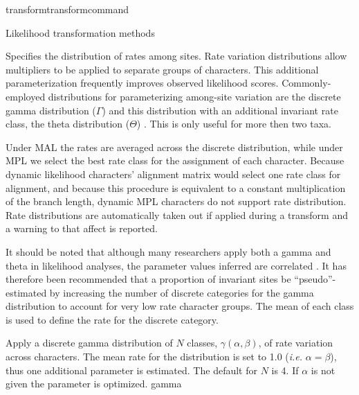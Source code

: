 \begin{command}{transform}{transformcommand}
\begin{arguments}
\begin{argumentgroup}{Likelihood transformation methods}
                {Specifies the distribution of rates among sites. Rate
                variation distributions allow multipliers to be applied to
                separate groups of characters. This additional parameterization
                frequently improves observed likelihood scores.
                Commonly-employed distributions for parameterizing among-site
                variation are the discrete gamma distribution ($\Gamma$)
                \cite{yang1994a} and this distribution with an additional
                invariant rate class, the theta distribution ($\Theta$)
                \cite{gu1995}. This is only useful for more then two taxa.
                
                \begin{statement}
                    Under MAL the rates are averaged across the
                    discrete distribution, while under MPL we select the best
                    rate class for the assignment of each character. Because
                    dynamic likelihood characters' alignment matrix would select
                    one rate class for alignment, and because this procedure is equivalent to a
                    constant multiplication of the branch length, dynamic MPL
                    characters do not support rate distribution. Rate distributions are
                    automatically taken out if applied during a transform and a
                    warning to that affect is reported.
                \end{statement}

                \begin{statement}
                    It should be noted that although many researchers apply both
                    a gamma and theta in likelihood analyses, the parameter
                    values inferred are correlated \cite{sullivan1999}.  It has
                    therefore been recommended that a proportion of invariant
                    sites be ``pseudo''-estimated by increasing the number of
                    discrete categories for the gamma distribution to account
                    for very low rate character groups. The mean of each class
                    is used to define the rate for the discrete category.
                \end{statement}

                \begin{description}

                        {Apply a discrete gamma distribution of $N$ classes,
                        $\gamma(\alpha,\beta)$, of rate variation across
                        characters. The mean rate for the distribution is set to
                        1.0 (\emph{i.e.} $\alpha = \beta$), thus one additional parameter is
                        estimated. The default for $N$ is 4. If $\alpha$ is
                        not given the parameter is optimized.}
                        {gamma}


\end{description}}
\end{argumentgroup}
\end{arguments}
\end{command}
